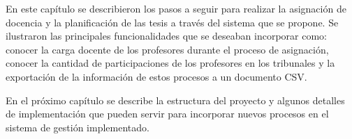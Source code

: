 En este capítulo se describieron los pasos a seguir para realizar la asignación de docencia 
y la planificación de las tesis a través del sistema que se propone. Se ilustraron las principales 
funcionalidades que se deseaban incorporar como: conocer la carga docente de los profesores durante 
el proceso de asignación, conocer la cantidad de participaciones de los profesores en los tribunales 
y la exportación de la información de estos procesos a un documento CSV.

En el próximo capítulo se describe la estructura del proyecto y algunos 
detalles de implementación que pueden servir para incorporar nuevos procesos 
en el sistema de gestión implementado.


